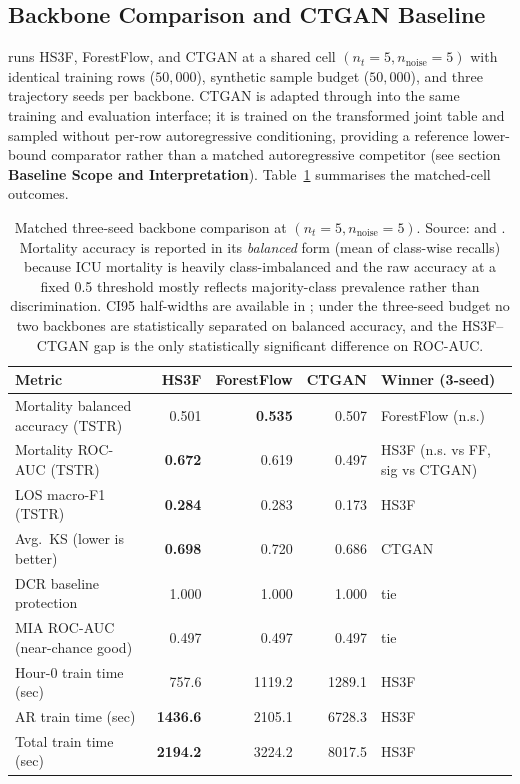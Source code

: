 \subsection{Backbone Comparison and CTGAN Baseline}
\label{sec:backbone-comparison}

 runs HS3F, ForestFlow, and CTGAN at a shared cell $(n_t{=}5, n_{\text{noise}}{=}5)$ with identical training rows ($50{,}000$), synthetic sample budget ($50{,}000$), and three trajectory seeds per backbone. CTGAN is adapted through  into the same training and evaluation interface; it is trained on the transformed joint table and sampled without per-row autoregressive conditioning, providing a reference lower-bound comparator rather than a matched autoregressive competitor (see section \textbf{Baseline Scope and Interpretation}). Table~\ref{tab:backbone-matched} summarises the matched-cell outcomes.

\begin{table}[htbp]
\centering
\small
\setlength{\tabcolsep}{4pt}
\begin{tabularx}{\textwidth}{@{}lrrr>{\raggedright\arraybackslash}X@{}}
\toprule
\textbf{Metric} & \textbf{HS3F} & \textbf{ForestFlow} & \textbf{CTGAN} & \textbf{Winner (3-seed)} \\
\midrule
Mortality balanced accuracy (TSTR) & 0.501 & \textbf{0.535} & 0.507 & ForestFlow (n.s.) \\
Mortality ROC-AUC (TSTR)  & \textbf{0.672} & 0.619 & 0.497 & HS3F (n.s. vs FF, sig vs CTGAN) \\
LOS macro-F1 (TSTR)       & \textbf{0.284} & 0.283 & 0.173 & HS3F \\
Avg.\ KS (lower is better)        & \textbf{0.698} & 0.720 & 0.686 & CTGAN \\
DCR baseline protection           & 1.000 & 1.000 & 1.000 & tie \\
MIA ROC-AUC (near-chance good)    & 0.497 & 0.497 & 0.497 & tie \\
Hour-0 train time (sec)           & 757.6 & 1119.2 & 1289.1 & HS3F \\
AR train time (sec)               & \textbf{1436.6} & 2105.1 & 6728.3 & HS3F \\
Total train time (sec)            & \textbf{2194.2} & 3224.2 & 8017.5 & HS3F \\
\bottomrule
\end{tabularx}
\caption{Matched three-seed backbone comparison at $(n_t{=}5, n_{\text{noise}}{=}5)$. Source:  and . Mortality accuracy is reported in its \emph{balanced} form (mean of class-wise recalls) because ICU mortality is heavily class-imbalanced and the raw accuracy at a fixed 0.5 threshold mostly reflects majority-class prevalence rather than discrimination. CI95 half-widths are available in ; under the three-seed budget no two backbones are statistically separated on balanced accuracy, and the HS3F--CTGAN gap is the only statistically significant difference on ROC-AUC.}
\label{tab:backbone-matched}
\end{table}

